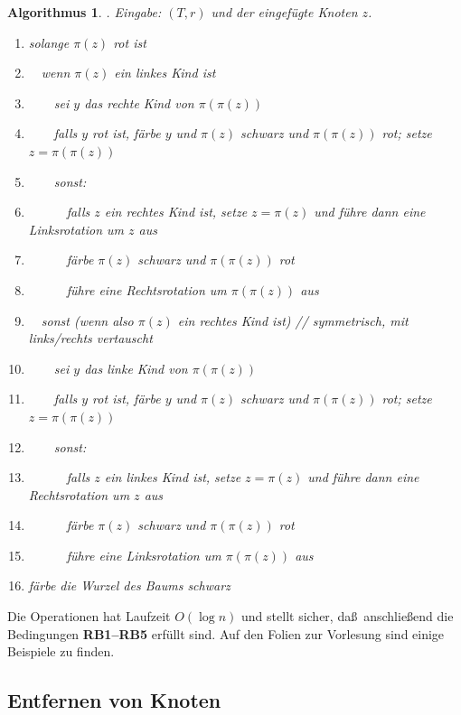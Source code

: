 \documentclass[10pt,reqno]{amsart}
\numberwithin{equation}{section}
\newtheorem{algorithm}[definition]{Algorithmus}
\begin{document}
\begin{algorithm}. {\em Eingabe:} $(T,r)$ und der eingef\"ugte Knoten $z$.
	\begin{enumerate}
		\item solange $\pi(z)$ rot ist
		\item $\quad$wenn $\pi(z)$ ein linkes Kind ist
		\item $\qquad$sei $y$ das rechte Kind von $\pi(\pi(z))$
		\item $\qquad$falls $y$ rot ist, f\"arbe $y$ und $\pi(z)$ schwarz und $\pi(\pi(z))$ rot; setze $z=\pi(\pi(z))$
		\item $\qquad$sonst:
		\item $\quad\qquad$falls $z$ ein rechtes Kind ist, setze $z=\pi(z)$ und f\"uhre dann eine Linksrotation um $z$ aus
		\item $\quad\qquad$f\"arbe $\pi(z)$ schwarz und $\pi(\pi(z))$ rot
		\item $\quad\qquad$f\"uhre eine Rechtsrotation um $\pi(\pi(z))$ aus
		\item $\quad$sonst (wenn also $\pi(z)$ ein rechtes Kind ist) \hfill // symmetrisch, mit links/rechts vertauscht
		\item $\qquad$sei $y$ das linke Kind von $\pi(\pi(z))$
		\item $\qquad$falls $y$ rot ist, f\"arbe $y$ und $\pi(z)$ schwarz und $\pi(\pi(z))$ rot; setze $z=\pi(\pi(z))$
		\item $\qquad$sonst:
		\item $\quad\qquad$falls $z$ ein linkes Kind ist, setze $z=\pi(z)$ und f\"uhre dann eine Rechtsrotation um $z$ aus
		\item $\quad\qquad$f\"arbe $\pi(z)$ schwarz und $\pi(\pi(z))$ rot
		\item $\quad\qquad$f\"uhre eine Linksrotation um $\pi(\pi(z))$ aus
		\item f\"arbe die Wurzel des Baums schwarz
	\end{enumerate}
\end{algorithm}

Die Operationen hat Laufzeit $O(\log n)$ und stellt sicher, da\ss\ anschlie\ss end die Bedingungen {\bf RB1--RB5} erf\"ullt sind.
Auf den Folien zur Vorlesung sind einige Beispiele zu finden.

\subsection{Entfernen von Knoten}\label{sec_rb_delete}
\end{document}
